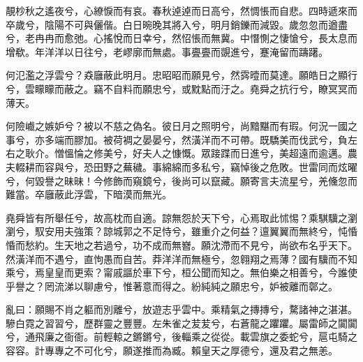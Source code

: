 \begin{pinyinscope}
靚杪秋之遙夜兮，心繚悷而有哀。春秋逴逴而日高兮，然惆悵而自悲。四時遞來而卒歲兮，陰陽不可與儷偕。白日晼晚其將入兮，明月銷鑠而減毀。歲忽忽而遒盡兮，老冉冉而愈弛。心搖悅而日幸兮，然怊悵而無冀。中憯惻之悽愴兮，長太息而增欷。年洋洋以日往兮，老嵺廓而無處。事亹亹而覬進兮，蹇淹留而躊躇。

何氾濫之浮雲兮？猋廱蔽此明月。忠昭昭而願見兮，然霠曀而莫達。願皓日之顯行兮，雲矇矇而蔽之。竊不自料而願忠兮，或黕點而汙之。堯舜之抗行兮，瞭冥冥而薄天。

何險巇之嫉妒兮？被以不慈之偽名。彼日月之照明兮，尚黯黮而有瑕。何況一國之事兮，亦多端而膠加。被荷裯之晏晏兮，然潢洋而不可帶。既驕美而伐武兮，負左右之耿介。憎慍惀之修美兮，好夫人之慷慨。眾踥蹀而日進兮，美超遠而逾邁。農夫輟耕而容與兮，恐田野之蕪穢。事綿綿而多私兮，竊悼後之危敗。世雷同而炫曜兮，何毀譽之昧昧！今修飾而窺鏡兮，後尚可以竄藏。願寄言夫流星兮，羌儵忽而難當。卒廱蔽此浮雲，下暗漠而無光。

堯舜皆有所舉任兮，故高枕而自適。諒無怨於天下兮，心焉取此怵惕？乘騏驥之瀏瀏兮，馭安用夫強策？諒城郭之不足恃兮，雖重介之何益？邅翼翼而無終兮，忳惛惛而愁約。生天地之若過兮，功不成而無嶜。願沈滯而不見兮，尚欲布名乎天下。然潢洋而不遇兮，直怐愚而自苦。莽洋洋而無極兮，忽翱翔之焉薄？國有驥而不知乘兮，焉皇皇而更索？甯戚謳於車下兮，桓公聞而知之。無伯樂之相善兮，今誰使乎譽之？罔流涕以聊慮兮，惟著意而得之。紛純純之願忠兮，妒被離而鄣之。

亂曰：願賜不肖之軀而別離兮，放遊志乎雲中。乘精氣之摶摶兮，騖諸神之湛湛。驂白霓之習習兮，歷群靈之豐豐。左朱雀之苃苃兮，右蒼龍之躣躣。屬雷師之闐闐兮，通飛廉之衙衙。前輕輬之鏘鏘兮，後輜乘之從從。載雲旗之委蛇兮，扈屯騎之容容。計專專之不可化兮，願遂推而為臧。賴皇天之厚德兮，還及君之無恙。


\end{pinyinscope}